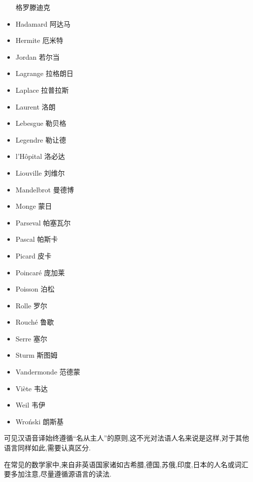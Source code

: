 \begin{multicols}{3}
\begin{itemize}
		格罗滕迪克
		\item Hadamard 阿达马
		\item Hermite 厄米特
		\item Jordan 若尔当
		\item Lagrange 拉格朗日
		\item Laplace 拉普拉斯
		\item Laurent 洛朗
		\item Lebesgue 勒贝格
		\item Legendre 勒让德
		\item l'H\^opital 洛必达
		\item Liouville 刘维尔
		\item Mandelbrot 曼德博
		\item Monge 蒙日
		\item Parseval 帕塞瓦尔
		\item Pascal 帕斯卡
		\item Picard 皮卡
		\item Poincaré 庞加莱
		\item Poisson 泊松
		\item Rolle 罗尔
		\item Rouché 鲁歇
		\item Serre 塞尔
		\item Sturm 斯图姆
		\item Vandermonde 范德蒙
		\item Viète 韦达
		\item Weil 韦伊
		\item Wroński 朗斯基
	\end{itemize}
\end{multicols}
可见汉语音译始终遵循``名从主人''的原则,这不光对法语人名来说是这样,对于其他语言同样如此,需要认真区分.

在常见的数学家中,来自非英语国家诸如古希腊,德国,苏俄,印度,日本的人名或词汇要多加注意,尽量遵循源语言的读法.

